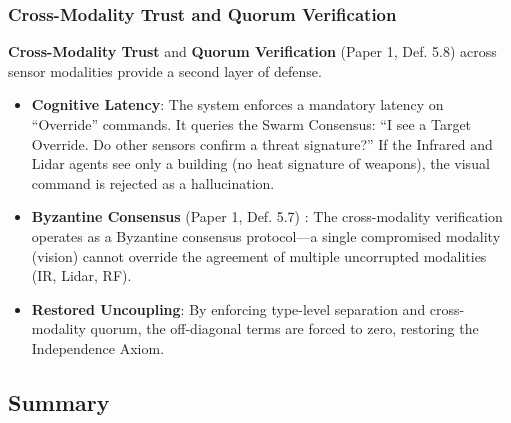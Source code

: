 \documentclass[
]{article}
\providecommand{\tightlist}{%
  \setlength{\itemsep}{0pt}\setlength{\parskip}{0pt}}
\begin{document}
\subsubsection{Cross-Modality Trust and Quorum
Verification}\label{cross-modality-trust-and-quorum-verification}

\textbf{Cross-Modality Trust} and \textbf{Quorum Verification} (Paper 1,
Def. 5.8) \cite{friedman2026cogsec1} across sensor modalities provide a
second layer of defense.

\begin{itemize}
\tightlist
\item
  \textbf{Cognitive Latency}: The system enforces a mandatory latency on
  ``Override'' commands. It queries the Swarm Consensus: ``I see a
  Target Override. Do other sensors confirm a threat signature?'' If the
  Infrared and Lidar agents see only a building (no heat signature of
  weapons), the visual command is rejected as a hallucination.
\item
  \textbf{Byzantine Consensus} (Paper 1, Def. 5.7)
  \cite{friedman2026cogsec1}: The cross-modality verification operates
  as a Byzantine consensus protocol---a single compromised modality
  (vision) cannot override the agreement of multiple uncorrupted
  modalities (IR, Lidar, RF).
\item
  \textbf{Restored Uncoupling}: By enforcing type-level separation and
  cross-modality quorum, the off-diagonal terms are forced to zero,
  restoring the Independence Axiom.
\end{itemize}

\subsection{Summary}\label{summary-3}
\end{document}
